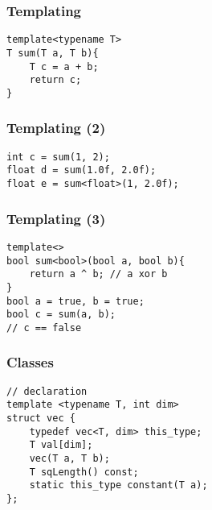
\begin{frame}
\end{frame}

\begin{frame}[fragile]
\frametitle{Templating}
\begin{lstlisting}
template<typename T>
T sum(T a, T b){
    T c = a + b;
    return c;
}
\end{lstlisting}
\end{frame}

\begin{frame}[fragile]
\frametitle{Templating (2)}
\begin{lstlisting}
int c = sum(1, 2);
float d = sum(1.0f, 2.0f);
float e = sum<float>(1, 2.0f);
\end{lstlisting}
\end{frame}

\begin{frame}[fragile]
\frametitle{Templating (3)}
\begin{lstlisting}
template<>
bool sum<bool>(bool a, bool b){
    return a ^ b; // a xor b
}
bool a = true, b = true;
bool c = sum(a, b);
// c == false
\end{lstlisting}
\end{frame}

\begin{frame}
\end{frame}

\begin{frame}[fragile]
\frametitle{Classes}
\begin{lstlisting}
// declaration
template <typename T, int dim>
struct vec {
    typedef vec<T, dim> this_type;
    T val[dim];
    vec(T a, T b);
    T sqLength() const;
    static this_type constant(T a);
};
\end{lstlisting}
\end{frame}


